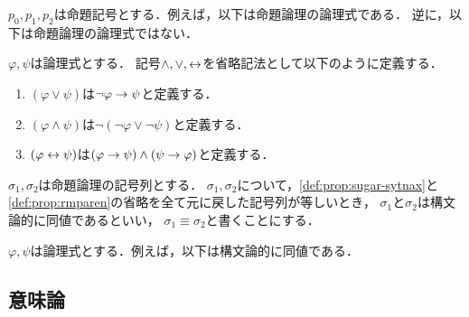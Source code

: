 \documentclass[a4paper]{jsarticle}
\begin{document}
\begin{myExample}[命題論理の論理式の例]
  $p_0,p_1,p_2$は命題記号とする．例えば，以下は命題論理の論理式である．
  逆に，以下は命題論理の論理式ではない．
\end{myExample}

\begin{myDefinition}
  \label{def:prop:sugar-sytnax}
  $\varphi, \psi$は論理式とする．
  記号$\land, \lor, \leftrightarrow$を省略記法として以下のように定義する．
  \begin{enumerate}
    \item $(\varphi \lor \psi)$は$\lnot\varphi \to \psi$と定義する．
    \item $(\varphi \land \psi)$は$\lnot(\lnot\varphi \lor \lnot\psi)$と定義する．
    \item $(\varphi \leftrightarrow \psi)$は$(\varphi \to \psi) \land (\psi \to \varphi)$と定義する．
  \end{enumerate}
\end{myDefinition}

\begin{myDefinition}[括弧の省略]
  \label{def:prop:rmparen}
\end{myDefinition}

\begin{myDefinition}[構文論的同値]
  $\sigma_1,\sigma_2$は命題論理の記号列とする．
  $\sigma_1,\sigma_2$について，\ref*{def:prop:sugar-sytnax}と\ref*{def:prop:rmparen}の省略を全て元に戻した記号列が等しいとき，
  $\sigma_1$と$\sigma_2$は構文論的に同値であるといい，
  $\sigma_1 \equiv \sigma_2$と書くことにする．
\end{myDefinition}

\begin{myExample}[構文論的同値の例]
  $\varphi, \psi$は論理式とする．例えば，以下は構文論的に同値である．
\end{myExample}

\subsection{意味論}
\end{document}
